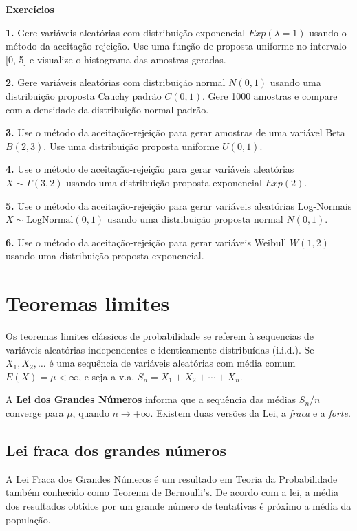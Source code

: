 \documentclass[
]{book}
\begin{document}
\textbf{Exercícios}

\textbf{1.} Gere variáveis aleatórias com distribuição exponencial
\(Exp(\lambda = 1)\) usando o método da aceitação-rejeição. Use uma função
de proposta uniforme no intervalo {[}0, 5{]} e visualize o histograma das
amostras geradas.

\textbf{2.} Gere variáveis aleatórias com distribuição normal \(N(0,1)\) usando
uma distribuição proposta Cauchy padrão \(C(0,1)\). Gere 1000 amostras e
compare com a densidade da distribuição normal padrão.

\textbf{3.} Use o método da aceitação-rejeição para gerar amostras de uma
variável Beta \(B(2, 3)\). Use uma distribuição proposta uniforme
\(U(0, 1)\).

\textbf{4.} Use o método de aceitação-rejeição para gerar variáveis
aleatórias \(X \sim \Gamma(3, 2)\) usando uma distribuição proposta
exponencial \(Exp(2)\).

\textbf{5.} Use o método da aceitação-rejeição para gerar variáveis
aleatórias Log-Normais \(X \sim \text{LogNormal}(0, 1)\) usando uma
distribuição proposta normal \(N(0, 1)\).

\textbf{6.} Use o método da aceitação-rejeição para gerar variáveis Weibull
\(W(1, 2)\) usando uma distribuição proposta exponencial.

\chapter{Teoremas limites}\label{teoremas-limites}

Os teoremas limites clássicos de probabilidade se referem à sequencias de variáveis aleatórias independentes e identicamente distribuídas (i.i.d.). Se \(X_1,X_2,\ldots\) é uma sequência de variáveis aleatórias com média comum \(E(X)=\mu < \infty\), e seja a v.a. \(S_n = X_1 + X_2 + \cdots + X_n\).

A \textbf{Lei dos Grandes Números} informa que a sequência das médias \(S_n/n\) converge para \(\mu\), quando \(n\to +\infty\). Existem duas versões da Lei, a \emph{fraca} e a \emph{forte}.

\section{Lei fraca dos grandes números}\label{lei-fraca-dos-grandes-nuxfameros}

A Lei Fraca dos Grandes Números é um resultado em Teoria da Probabilidade também conhecido como Teorema de Bernoulli's. De acordo com a lei, a média dos resultados obtidos por um grande número de tentativas é próximo a média da população.
\end{document}

